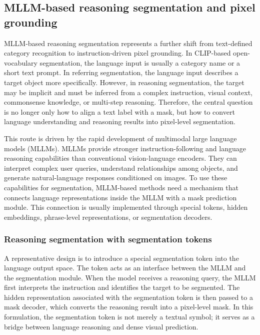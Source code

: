 \subsection{MLLM-based reasoning segmentation and pixel grounding}
\label{subsec:mllm_reasoning_segmentation}

MLLM-based reasoning segmentation represents a further shift from text-defined category recognition to instruction-driven pixel grounding. 
In CLIP-based open-vocabulary segmentation, the language input is usually a category name or a short text prompt. 
In referring segmentation, the language input describes a target object more specifically. 
However, in reasoning segmentation, the target may be implicit and must be inferred from a complex instruction, visual context, commonsense knowledge, or multi-step reasoning. 
Therefore, the central question is no longer only how to align a text label with a mask, but how to convert language understanding and reasoning results into pixel-level segmentation.

This route is driven by the rapid development of multimodal large language models (MLLMs). 
MLLMs provide stronger instruction-following and language reasoning capabilities than conventional vision-language encoders. 
They can interpret complex user queries, understand relationships among objects, and generate natural-language responses conditioned on images. 
To use these capabilities for segmentation, MLLM-based methods need a mechanism that connects language representations inside the MLLM with a mask prediction module. 
This connection is usually implemented through special tokens, hidden embeddings, phrase-level representations, or segmentation decoders.

\subsubsection{Reasoning segmentation with segmentation tokens}

A representative design is to introduce a special segmentation token into the language output space. 
The token acts as an interface between the MLLM and the segmentation module. 
When the model receives a reasoning query, the MLLM first interprets the instruction and identifies the target to be segmented. 
The hidden representation associated with the segmentation token is then passed to a mask decoder, which converts the reasoning result into a pixel-level mask. 
In this formulation, the segmentation token is not merely a textual symbol; it serves as a bridge between language reasoning and dense visual prediction.

